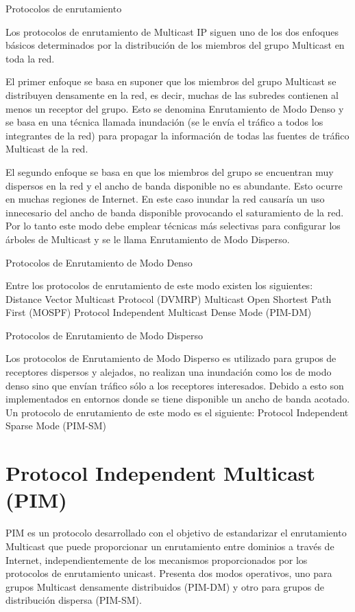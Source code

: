 \documentclass[12pt,a4paper,oneside]{book}
\begin{document}
 Protocolos de enrutamiento

Los protocolos de enrutamiento de Multicast IP siguen uno de los dos enfoques básicos determinados por la distribución de los miembros del grupo Multicast en toda la red.

El primer enfoque se basa en suponer que los miembros del grupo Multicast se distribuyen densamente en la red, es decir, muchas de las subredes contienen al menos un receptor del grupo. Esto se denomina Enrutamiento de Modo Denso y se basa en una técnica llamada inundación (se le envía el tráfico a todos los integrantes de la red) para propagar la información de todas las fuentes de tráfico Multicast de la red.
	
El segundo enfoque se basa en que los miembros del grupo se encuentran muy dispersos en la red y el ancho de banda disponible no es abundante. Esto ocurre en muchas regiones de Internet. En este caso inundar la red causaría un uso innecesario del ancho de banda disponible provocando el saturamiento de la red. Por lo tanto este modo debe emplear técnicas más selectivas para configurar los árboles de Multicast y se le llama Enrutamiento de Modo Disperso.


Protocolos de Enrutamiento de Modo Denso
	
Entre los protocolos de enrutamiento de este modo existen los siguientes:
Distance Vector Multicast Protocol (DVMRP)
Multicast Open Shortest Path First (MOSPF)
Protocol Independent Multicast Dense Mode (PIM-DM)


Protocolos de Enrutamiento de Modo Disperso
	
Los protocolos de Enrutamiento de Modo Disperso es utilizado para grupos de receptores dispersos y alejados, no realizan una inundación como los de modo denso sino que envían tráfico sólo a los receptores interesados. Debido a esto son implementados en entornos donde se tiene disponible un ancho de banda acotado. Un protocolo de enrutamiento de este modo es el siguiente:
Protocol Independent Sparse Mode (PIM-SM)


\section{Protocol Independent Multicast (PIM)}

PIM es un protocolo desarrollado con el objetivo de estandarizar el enrutamiento Multicast que puede proporcionar un enrutamiento entre dominios a través de Internet, independientemente de los mecanismos proporcionados por los protocolos de enrutamiento unicast. Presenta dos modos operativos, uno para grupos Multicast densamente distribuidos (PIM-DM) y otro para grupos de distribución dispersa (PIM-SM).
\end{document}
